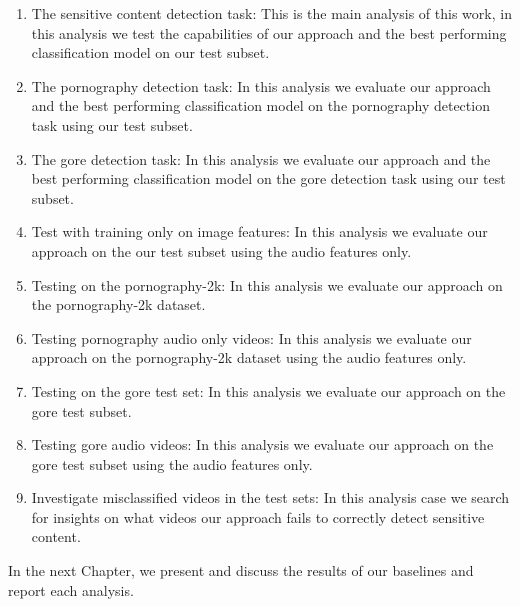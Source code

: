 \begin{enumerate}[start=0,label={(\bfseries E\arabic*):}]
\item The sensitive content detection task: This is the main analysis of this work, in this analysis we test the capabilities of our approach and the best performing classification model on our test subset.%

\item The pornography detection task: In this analysis we evaluate our approach and the best performing classification model on the pornography detection task using our test subset.

\item The gore detection task: In this analysis we evaluate our approach and the best performing classification model on the gore detection task using our test subset.

\item Test with training only on image features: In this analysis we evaluate our approach on the our test subset using the audio features only.

\item Testing on the pornography-2k:  In this analysis we evaluate our approach on the pornography-2k dataset.

\item Testing pornography audio only videos: In this analysis we evaluate our approach on the pornography-2k dataset using the audio features only.

\item Testing on the gore test set: In this analysis we evaluate our approach on the gore test subset.

\item Testing gore audio videos: In this analysis we evaluate our approach on the gore test subset using the audio features only.
\item Investigate misclassified videos in the test sets: In this analysis case we search for insights on what videos our approach fails to correctly detect sensitive content.
\end{enumerate}

In the next Chapter, we present and discuss the results of our baselines and report each analysis.